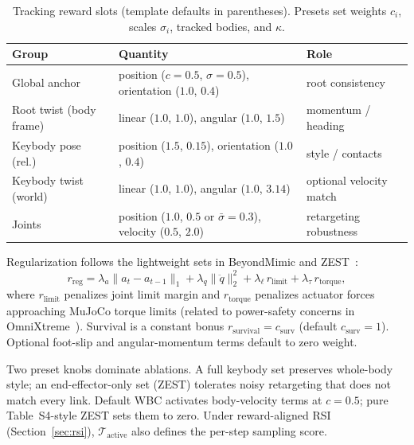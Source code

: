 \documentclass[11pt,a4paper]{article}
\begin{document}
\begin{table}[t]
  \centering
  \small
  \caption{Tracking reward slots (template defaults in parentheses). Presets set
  weights $c_i$, scales $\sigma_i$, tracked bodies, and $\kappa$.}
  \label{tab:rewards}
  \begin{tabular}{@{}llp{4.6cm}@{}}
    \toprule
    Group & Quantity & Role \\
    \midrule
    Global anchor & position ($c{=}0.5$, $\sigma{=}0.5$),
      orientation ($1.0$, $0.4$) & root consistency \\
    Root twist (body frame) & linear ($1.0$, $1.0$),
      angular ($1.0$, $1.5$) & momentum / heading \\
    Keybody pose (rel.) & position ($1.5$, $0.15$),
      orientation ($1.0$, $0.4$) & style / contacts \\
    Keybody twist (world) & linear ($1.0$, $1.0$),
      angular ($1.0$, $3.14$) & optional velocity match \\
    Joints & position ($1.0$, $0.5$ or $\bar\sigma{=}0.3$),
      velocity ($0.5$, $2.0$) & retargeting robustness \\
    \bottomrule
  \end{tabular}
\end{table}

Regularization follows the lightweight sets in BeyondMimic and
ZEST~\citep{liao2025beyondmimic,zest2026}:
\begin{equation}
  r_{\mathrm{reg}} =
    \lambda_a \|a_t - a_{t-1}\|_1
    + \lambda_q \|\ddot q\|_2^2
    + \lambda_{\ell}\, r_{\mathrm{limit}}
    + \lambda_{\tau}\, r_{\mathrm{torque}},
  \label{eq:reg}
\end{equation}
where $r_{\mathrm{limit}}$ penalizes joint limit margin and $r_{\mathrm{torque}}$
penalizes actuator forces approaching MuJoCo torque limits (related to power-safety
concerns in OmniXtreme~\citep{omnixtreme2026}). Survival is a constant bonus
$r_{\mathrm{survival}}=c_{\mathrm{surv}}$ (default $c_{\mathrm{surv}}{=}1$).
Optional foot-slip and angular-momentum terms default to zero weight.

Two preset knobs dominate ablations. A full keybody set preserves whole-body
style; an end-effector-only set (ZEST) tolerates noisy retargeting that does not
match every link. Default WBC activates body-velocity terms at $c{=}0.5$; pure
Table~S4-style ZEST sets them to zero. Under reward-aligned RSI
(Section~\ref{sec:rsi}), $\mathcal{T}_{\mathrm{active}}$ also defines the
per-step sampling score.
\end{document}
